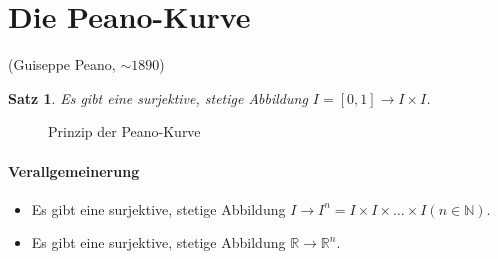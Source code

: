 \documentclass[a4paper,11pt,notitlepage]{report}
\newtheorem{theorem}{Satz}[chapter]
\newcommand{\R}{{\ensuremath{\mathbb{R}}}}
\newcommand{\N}{{\ensuremath{\mathbb{N}}}}
\begin{document}
\section{Die Peano-Kurve}
(Guiseppe Peano, $\sim 1890$)
\begin{theorem}
	Es gibt eine surjektive, stetige Abbildung $I = [0,1] \rightarrow I \times I$.
\end{theorem}

\begin{figure}[h]
\centering
{}\qquad
{}
\caption{Prinzip der Peano-Kurve}
\end{figure}

\paragraph{Verallgemeinerung}
\begin{itemize}
\item Es gibt eine surjektive, stetige Abbildung $I \rightarrow I^n = I \times I \times \ldots \times I (n \in \N)$.
\item Es gibt eine surjektive, stetige Abbildung $\R \rightarrow \R^n$.
\end{itemize}
\end{document}

